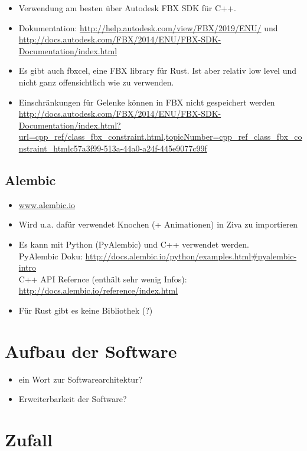 \begin{itemize}
 \item Verwendung am besten über Autodesk FBX SDK für C++. 
 \item Dokumentation: \url{http://help.autodesk.com/view/FBX/2019/ENU/} und \url{http://docs.autodesk.com/FBX/2014/ENU/FBX-SDK-Documentation/index.html}
 \item Es gibt auch fbxcel, eine FBX library für Rust. Ist aber relativ low level und nicht ganz offensichtlich wie zu verwenden.
 \item Einschränkungen für Gelenke können in FBX nicht gespeichert werden \url{http://docs.autodesk.com/FBX/2014/ENU/FBX-SDK-Documentation/index.html?url=cpp_ref/class_fbx_constraint.html,topicNumber=cpp_ref_class_fbx_constraint_htmlc57a3f99-513a-44a0-a24f-445e9077c99f}
\end{itemize}

\subsection{Alembic}

\begin{itemize}
 \item \url{www.alembic.io}
 \item Wird u.a. dafür verwendet Knochen (+ Animationen) in Ziva zu importieren
 \item Es kann mit Python (PyAlembic) und C++ verwendet werden.\\
 PyAlembic Doku: \url{http://docs.alembic.io/python/examples.html#pyalembic-intro}\\
 C++ API Refernce (enthält sehr wenig Infos): \url{http://docs.alembic.io/reference/index.html}
 \item Für Rust gibt es keine Bibliothek (?)
\end{itemize}


\section{Aufbau der Software}

\begin{itemize}
 \item ein Wort zur Softwarearchitektur?
 \item Erweiterbarkeit der Software?
\end{itemize}


\section{Zufall}

